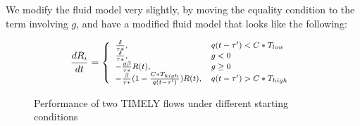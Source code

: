 We modify the fluid model very slightly, by moving the equality condition
to the term involving $g$, and have a modified fluid model that looks like the
following:

\begin{equation}
\small
\frac{{dR_i}}{{dt}} = \left\{ \begin{array}{ll}
\frac{\delta }{{\tau *}}, & q(t - \tau ') < C*{T_{low}}\\
\frac{\delta }{{\tau *}}, & g < 0\\
 - \frac{{g\beta }}{{\tau *}}R(t), & g \ge 0\\
 - \frac{\beta }{{\tau *}}(1 - \frac{{C*{T_{high}}}}{{q(t - \tau ')}})R(t), & q(t - \tau ') > C*{T_{high}}
\end{array} \right.\\
\label{eq:timely_r_modified}
\end{equation}

\begin{figure}[t]
\center
{}
\caption{Performance of two TIMELY flows under different starting conditions}
\label{fig:timely_unstable}
\end{figure}

